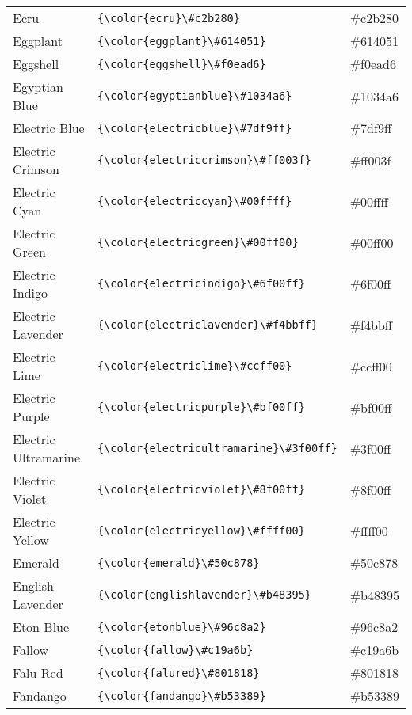 \documentclass[9.5pt]{article}
\begin{document}
\begin{longtable}{l | l | l}
	Ecru & \verb!{\color{ecru}\#c2b280}! & {\color{ecru}\#c2b280}\\
	Eggplant & \verb!{\color{eggplant}\#614051}! & {\color{eggplant}\#614051}\\
	Eggshell & \verb!{\color{eggshell}\#f0ead6}! & {\color{eggshell}\#f0ead6}\\
	Egyptian Blue & \verb!{\color{egyptianblue}\#1034a6}! & {\color{egyptianblue}\#1034a6}\\
	Electric Blue & \verb!{\color{electricblue}\#7df9ff}! & {\color{electricblue}\#7df9ff}\\
	Electric Crimson & \verb!{\color{electriccrimson}\#ff003f}! & {\color{electriccrimson}\#ff003f}\\
	Electric Cyan & \verb!{\color{electriccyan}\#00ffff}! & {\color{electriccyan}\#00ffff}\\
	Electric Green & \verb!{\color{electricgreen}\#00ff00}! & {\color{electricgreen}\#00ff00}\\
	Electric Indigo & \verb!{\color{electricindigo}\#6f00ff}! & {\color{electricindigo}\#6f00ff}\\
	Electric Lavender & \verb!{\color{electriclavender}\#f4bbff}! & {\color{electriclavender}\#f4bbff}\\
	Electric Lime & \verb!{\color{electriclime}\#ccff00}! & {\color{electriclime}\#ccff00}\\
	Electric Purple & \verb!{\color{electricpurple}\#bf00ff}! & {\color{electricpurple}\#bf00ff}\\
	Electric Ultramarine & \verb!{\color{electricultramarine}\#3f00ff}! & {\color{electricultramarine}\#3f00ff}\\
	Electric Violet & \verb!{\color{electricviolet}\#8f00ff}! & {\color{electricviolet}\#8f00ff}\\
	Electric Yellow & \verb!{\color{electricyellow}\#ffff00}! & {\color{electricyellow}\#ffff00}\\
	Emerald & \verb!{\color{emerald}\#50c878}! & {\color{emerald}\#50c878}\\
	English Lavender & \verb!{\color{englishlavender}\#b48395}! & {\color{englishlavender}\#b48395}\\
	Eton Blue & \verb!{\color{etonblue}\#96c8a2}! & {\color{etonblue}\#96c8a2}\\
	Fallow & \verb!{\color{fallow}\#c19a6b}! & {\color{fallow}\#c19a6b}\\
	Falu Red & \verb!{\color{falured}\#801818}! & {\color{falured}\#801818}\\
	Fandango & \verb!{\color{fandango}\#b53389}! & {\color{fandango}\#b53389}\\

\end{longtable}
\end{document}
